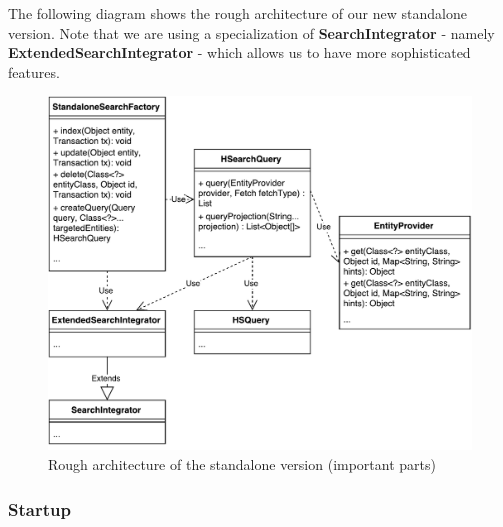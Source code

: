 \pagebreak

\noindent
The following diagram shows the rough architecture of our new standalone version. Note that we are using a specialization of \textbf{SearchIntegrator} - namely \textbf{ExtendedSearchIntegrator} - which allows us to have more sophisticated features.
\\
\begin{figure}[ht]
	\centering
	\includegraphics[scale=0.6]{images/standalone_min_architecture.pdf}
	\caption{Rough architecture of the standalone version (important parts)}
	\label{standalone_min_architecture}
\end{figure}

\pagebreak

\subsubsection{Startup}

